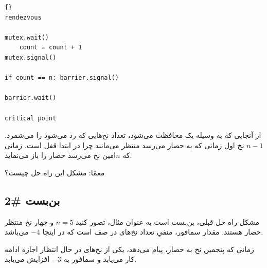 \documentclass{book}
\newcommand{\clearemptydoublepage}{\newpage\cleardoublepage}
\begin{document}
\begin{latin}
\begin{latin}
\begin{lstlisting}[title=\rl{نا راه حل حصار}]{}
rendezvous

mutex.wait()
    count = count + 1
mutex.signal()

if count == n: barrier.signal()

barrier.wait()

critical point
\end{lstlisting}
\end{latin}
\end{latin}

     از آنجایی که  به وسیله یک  محافظت می‌شود، تعداد نخ‌هایی که رد می‌شود را می‌شمرد.
     $n-1$ 
     نخ اول زمانی که به حصار می‌رسد منتظر می‌مانند چرا در ابتدا قفل است. زمانی که $n$امین نخ می‌رسد حصار را باز می‌نماید. 
     
    معمّا: مشکل این راه حل چیست؟
    
\clearemptydoublepage
\subsection{بن‌بست \#2}

    مشکل راه حل قبلی، بن‌بست است
    به عنوان مثال، تصور کنید $n=5$ و چهار نخ منتظر حصار هستند. مقدار سمافور، منفیِ تعداد نخ‌های در صف است که در اینجا $-4$ می‌باشد. 
    
    زمانی که پنجمین نخ به حصار، پیام می‌دهد، یکی از نخ‌های در حال انتظار اجازه ادامه کار می‌یابد و سمافور به $-3$ افزایش می‌یابد. 
    
\end{document}
